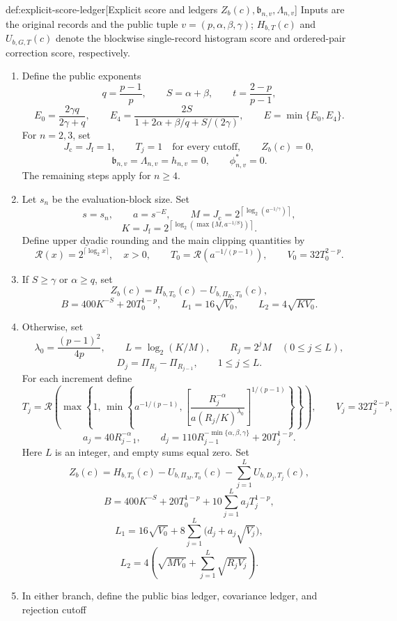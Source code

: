 \documentclass[11pt]{article}
\begin{document}
\begin{algorithmv}{def:explicit-score-ledger}[Explicit score and ledgers \(Z_b(c),\mathfrak b_{n,v},\Lambda_{n,v}\)]
Inputs are the original records and the public tuple \(v=(p,\alpha,\beta,\gamma)\); \(H_{b,T}(c)\) and \(U_{b,G,T}(c)\) denote the blockwise single-record histogram score and ordered-pair correction score, respectively.
\begin{enumerate}
\item Define the public exponents
\[
q=\frac{p-1}{p},
\qquad
S=\alpha+\beta,
\qquad
t=\frac{2-p}{p-1},
\]
\[
E_0=\frac{2\gamma q}{2\gamma+q},
\qquad
E_4=\frac{2S}{1+2\alpha+\beta/q+S/(2\gamma)},
\qquad
E=\min\{E_0,E_4\}.
\]
For \(n=2,3\), set
\[
J_{\mathrm c}=J_{\mathrm f}=1,
\qquad
T_j=1\quad\text{for every cutoff},
\qquad
Z_b(c)=0,
\]
\[
\mathfrak b_{n,v}=\Lambda_{n,v}=h_{n,v}=0,
\qquad
\phi^*_{n,v}=0.
\]
The remaining steps apply for \(n\ge4\).
\item Let \(s_n\) be the evaluation-block size. Set
\[
s=s_n,
\qquad
a=s^{-E},
\qquad
M=J_{\mathrm c}
=
2^{\left\lceil\log_2(a^{-1/\gamma})\right\rceil},
\]
\[
K=J_{\mathrm f}
=
2^{\left\lceil\log_2\!\left(\max\{M,a^{-1/S}\}\right)\right\rceil}.
\]
Define upper dyadic rounding and the main clipping quantities by
\[
\mathcal R(x)=2^{\lceil\log_2x\rceil},
\quad x>0,
\qquad
T_0=\mathcal R(a^{-1/(p-1)}),
\qquad
V_0=32T_0^{2-p}.
\]
\item If \(S\ge\gamma\) or \(\alpha\ge q\), set
\[
Z_b(c)=H_{b,T_0}(c)-U_{b,\Pi_K,T_0}(c),
\]
\[
B=400K^{-S}+20T_0^{1-p},
\qquad
L_1=16\sqrt{V_0},
\qquad
L_2=4\sqrt{KV_0}.
\]
\item Otherwise, set
\[
\lambda_0=\frac{(p-1)^2}{4p},
\qquad
L=\log_2(K/M),
\qquad
R_j=2^jM\quad(0\le j\le L),
\]
\[
D_j=\Pi_{R_j}-\Pi_{R_{j-1}},
\qquad 1\le j\le L.
\]
For each increment define
\[
T_j=
\mathcal R\!\left(
\max\!\left\{
1,\,
\min\!\left\{
a^{-1/(p-1)},
\left[
\frac{R_j^{-\alpha}}{a(R_j/K)^{\lambda_0}}
\right]^{1/(p-1)}
\right\}
\right\}
\right),
\qquad
V_j=32T_j^{2-p},
\]
\[
a_j=40R_{j-1}^{-\alpha},
\qquad
d_j=
110R_{j-1}^{-\min\{\alpha,\beta,\gamma\}}
+20T_j^{1-p}.
\]
Here \(L\) is an integer, and empty sums equal zero. Set
\[
Z_b(c)=
H_{b,T_0}(c)-U_{b,\Pi_M,T_0}(c)
-\sum_{j=1}^{L}U_{b,D_j,T_j}(c),
\]
\[
B=
400K^{-S}+20T_0^{1-p}
+10\sum_{j=1}^{L}a_jT_j^{1-p},
\]
\[
L_1=
16\sqrt{V_0}
+8\sum_{j=1}^{L}\bigl(d_j+a_j\sqrt{V_j}\bigr),
\]
\[
L_2=
4\left(
\sqrt{MV_0}+\sum_{j=1}^{L}\sqrt{R_jV_j}
\right).
\]
\item In either branch, define the public bias ledger, covariance ledger, and rejection cutoff

\end{enumerate}
\end{algorithmv}
\end{document}
